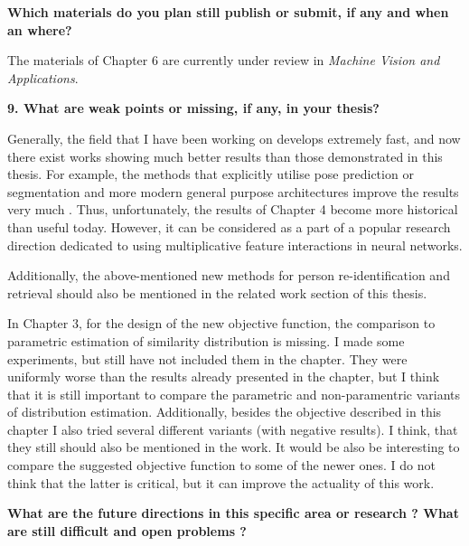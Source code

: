 \documentclass[a4paper, 11pt, oneside]{Thesis}  %
\begin{document}
\textbf{Which materials do you plan still publish or submit, if any and when an where?}

The materials of Chapter 6 are currently under review in \textit{Machine Vision and Applications}.

\bigskip\ident\textbf{9. What are weak points or missing, if any, in your thesis?
}



Generally, the field that I have been working on develops  extremely fast, and now there exist works showing much better results than those demonstrated in this thesis. For example, the methods  that explicitly utilise pose prediction or segmentation and more modern general purpose architectures improve the results very much \citep{saquib2018pose, suh2018part, kalayeh2018human}. Thus, unfortunately, the results of Chapter 4 become more historical than useful today. However, it can be considered as a part of a popular research direction dedicated to using multiplicative feature interactions in neural networks.

Additionally, the above-mentioned new methods for person re-identification and retrieval should also be mentioned in the related work section of this thesis.

In Chapter 3, for the design of the new objective function, the comparison to parametric estimation of similarity distribution is missing. I made some experiments, but still have not included them in the chapter. They were uniformly worse than the results already presented in the chapter, but I think that it is still important to compare the parametric and non-paramentric variants of distribution estimation. Additionally, besides the objective described in this chapter I also tried several different variants (with negative results). I think, that they still should also be mentioned in the work. It would be also be interesting to compare the suggested objective function to some of the newer ones. I do not think that the latter is critical, but it can improve the actuality of this work.

\textbf{What are the future directions in this specific area or research ?
What are still difficult and open problems ?}
\end{document}
